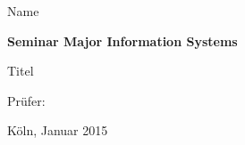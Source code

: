 \vspace*{1mm}

\thispagestyle{empty}
Name

\vspace*{32mm}

% 
\begin{center}
\textbf{
    Seminar
\linebreak
    Major Information Systems
}
\end{center}

\vspace*{32mm}

\begin{center}
\LARGE 
Titel
\end{center}

\vspace*{32mm}

\begin{center}
Prüfer: 
\end{center}

\vspace*{32mm}

\begin{center}
Köln, Januar 2015
\end{center}